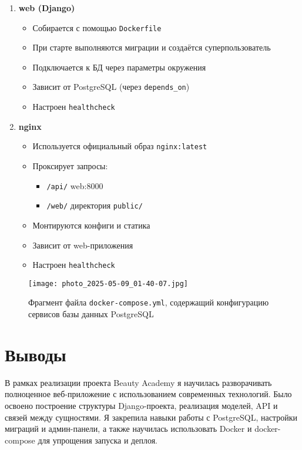 \documentclass[a4paper,12pt]{article}
\begin{document}
\begin{itemize}[leftmargin=1.2cm]
\begin{enumerate}
    \item \textbf{web (Django)}
    \begin{itemize}
        \item Собирается с помощью \texttt{Dockerfile}
        \item При старте выполняются миграции и создаётся суперпользователь
        \item Подключается к БД через параметры окружения
        \item Зависит от PostgreSQL (через \texttt{depends\_on})
        \item Настроен \texttt{healthcheck}
    \end{itemize}

    \item \textbf{nginx}
    \begin{itemize}
        \item Используется официальный образ \texttt{nginx:latest}
        \item Проксирует запросы:
        \begin{itemize}
            \item \texttt{/api/} \textrightarrow{} web:8000
            \item \texttt{/web/} \textrightarrow{} директория \texttt{public/}
        \end{itemize}
        \item Монтируются конфиги и статика
        \item Зависит от web-приложения
        \item Настроен \texttt{healthcheck}
    \end{itemize}
\end{enumerate}

\vspace{1em}
\noindent\textbf{} 
\begin{figure}[H]
    \centering
    \texttt{[image: photo\_2025-05-09\_01-40-07.jpg]}
    \caption{Фрагмент файла \texttt{docker-compose.yml}, содержащий конфигурацию сервисов базы данных PostgreSQL}
    \label{fig:nginx-config}
\end{figure}

\newpage
\section{Выводы}

В рамках реализации проекта Beauty Academy я научилась разворачивать полноценное веб-приложение с использованием современных технологий. Было освоено построение структуры Django-проекта, реализация моделей, API и связей между сущностями. Я закрепила навыки работы с PostgreSQL, настройки миграций и админ-панели, а также научилась использовать Docker и docker-compose для упрощения запуска и деплоя.


\end{itemize}
\end{document}
